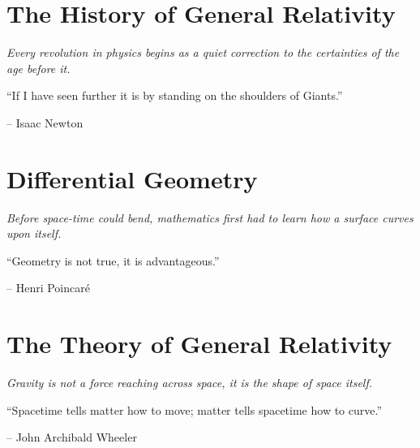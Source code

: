 \documentclass[english,11pt,twoside,openright]{book}
\begin{document}
	\hypersetup{pageanchor=true}

	\tableofcontents
	\listoffigures

	\mainmatter

	

	

	\chapter{The History of General Relativity}\label{chap:History}
	\thispagestyle{empty}
	\vspace*{2cm}
	\begin{center}
		{\itshape\Huge Every revolution in physics begins as a quiet correction to the certainties of the age before it. \par}
		\vspace{1cm}
		\epigraph{``If I have seen further it is by standing on the shoulders of Giants.''}{-- Isaac Newton}
	\end{center}
	\clearpage

	

	\chapter{Differential Geometry}\label{chap:DiffGeo}
	\thispagestyle{empty}
	\vspace*{2cm}
	\begin{center}
		{\itshape\Huge Before space-time could bend, mathematics first had to learn how a surface curves upon itself. \par}
		\vspace{1cm}
		\epigraph{``Geometry is not true, it is advantageous.''}{-- Henri Poincaré}
	\end{center}
	\clearpage

	

	\chapter{The Theory of General Relativity}\label{chap:Theory}
	\thispagestyle{empty}
	\vspace*{2cm}
	\begin{center}
		{\itshape\Huge Gravity is not a force reaching across space, it is the shape of space itself. \par}
		\vspace{1cm}
		\epigraph{``Spacetime tells matter how to move; matter tells spacetime how to curve.''}{-- John Archibald Wheeler}
	\end{center}
	\clearpage
\end{document}
